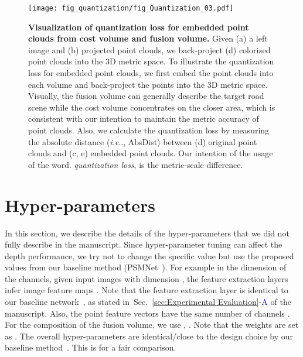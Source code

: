 \documentclass[letterpaper, 10 pt, conference]{ieeeconf}
\makeatletter
\DeclareRobustCommand\onedot{\futurelet\@let@token\@onedot}
\def\@onedot{\ifx\@let@token.\else.\null\fi\xspace}
\def\ie{\emph{i.e}\onedot} \def\Ie{{I.e}\onedot}
\newcommand{\Sref}[1]{Sec.~\textcolor{blue}{\ref{#1}}}
\makeatother
\begin{document}
\begin{figure*}[!t]
\centering
\texttt{[image: fig\_quantization/fig\_Quantization\_03.pdf]}
\vspace{-4mm}
\caption{\textbf{Visualization of quantization loss for embedded point clouds from cost volume and fusion volume.} Given (a) a left image and (b) projected point clouds, we back-project (d) colorized point clouds into the 3D metric space. 
To illustrate the quantization loss for embedded point clouds, we first embed the point clouds into each volume and back-project the points into the 3D metric space. 
Visually, the fusion volume can generally describe the target road scene while the cost volume concentrates on the closer area, which is consistent with our intention to maintain the metric accuracy of point clouds.
Also, we calculate the quantization loss by measuring the absolute distance (\ie, AbsDist) between (d) original point clouds and (c, e) embedded point clouds. 
Our intention of the usage of the word. \textit{quantization loss}, is the metric-scale difference.} 
\label{fig:quantization}
\end{figure*}




\section{Hyper-parameters}
\label{supp-sec:Hyper-parameters}

In this section, we describe the details of the hyper-parameters that we did not fully describe in the manuscript. Since hyper-parameter tuning can affect the depth performance, we try not to change the specific value but use the proposed values from our baseline method (PSMNet~\cite{psmnet}). For example in the dimension of the channels, given input images with dimension , the feature extraction layers infer image feature maps . Note that the feature extraction layer is identical to our baseline network~\cite{psmnet}, as stated in~\Sref{sec:Experimental Evaluation}-\textcolor{blue}{A} of the manuscript. Also, the point feature vectors  have the same number of channels . For the composition of the fusion volume, we use , . 
Note that the weights are set as . The overall hyper-parameters are identical/close to the design choice by our baseline method~\cite{psmnet}. This is for a fair comparison.
\end{document}
